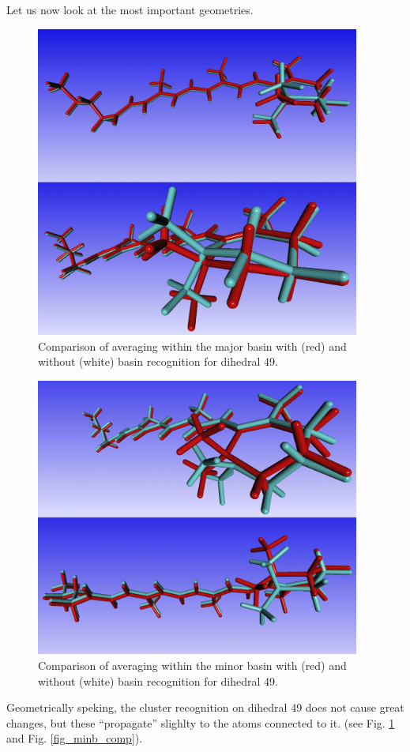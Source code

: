 \documentclass[twoside, 12pt]{article}
\begin{document}
Let us now look at the most important geometries.

\begin{figure}[H]
\centering
\includegraphics[width=0.95\textwidth]{./figures/mb_comp.png}
\caption{Comparison of averaging within the major basin with (red) and without (white) basin recognition for dihedral 49.} 
\label{fig:mb_comp}
\end{figure}

\begin{figure}[H]
\centering
\includegraphics[width=0.95\textwidth]{./figures/minb_comp.png}
\caption{Comparison of averaging within the minor basin with (red) and without (white) basin recognition for dihedral 49.} 
\label{fig:minb_comp}
\end{figure}
Geometrically speking, the cluster recognition on dihedral 49 does not cause great changes, but these ``propagate'' slighlty to the atoms connected to it. (see Fig. \ref{fig:mb_comp} and Fig. \ref{fig_minb_comp}).
\end{document}
